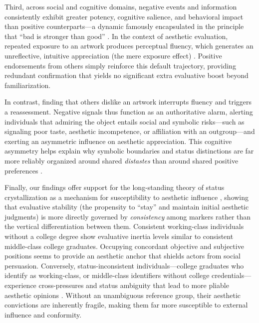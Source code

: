 \documentclass[12pt, letterpaper]{article}
\begin{document}
Third, across social and cognitive domains, negative events and information consistently exhibit greater potency, cognitive salience, and behavioral impact than positive counter\-parts---a dynamic famously encapsulated in the principle that ``bad is stronger than good'' \citep{baumeister2001bad-19b, rozin2001negativity-01e}. In the context of aesthetic evaluation, repeated exposure to an artwork produces perceptual fluency, which generates an unreflective, intuitive appreciation (the mere exposure effect) \citep{zajonc1968attitudinal, reber1998effects-efe, cutting2003gustave}. Positive endorsements from others simply reinforce this default trajectory, providing redundant confirmation that yields no significant extra evaluative boost beyond familiarization. 

In contrast, finding that others dislike an artwork interrupts fluency and triggers a reassessment. Negative signals thus function as an authoritative alarm, alerting individuals that admiring the object entails social and symbolic risks---such as signaling poor taste, aesthetic incompetence, or affiliation with an outgroup---and exerting an asymmetric influence on aesthetic appreciation. This cognitive asymmetry \citep{cerulo2010mining-1c1} helps explain why symbolic boundaries and status distinctions are far more reliably organized around shared \textit{distastes} than around shared positive preferences \citep{bourdieu1984, bryson1996, lizardo2016cultural-aaa}.

Finally, our findings offer support for the long-standing theory of status crystallization as a mechanism for susceptibility to aesthetic influence \citep{lenski1954status, hope1975models}, showing that evaluative stability (the propensity to ``stay'' and maintain initial aesthetic judgments) is more directly governed by \textit{consistency} among markers rather than the vertical differentiation between them. Consistent working-class individuals without a college degree show evaluative inertia levels similar to consistent middle-class college graduates. Occupying concordant objective and subjective positions seems to provide an aesthetic anchor that shields actors from social persuasion. Conversely, status-inconsistent individuals---college graduates who identify as working-class, or middle-class identifiers without college credentials---experience cross-pressures and status ambiguity that lead to more pliable aesthetic opinions \citep{davis1963structural-90b, correll2003expectations}. Without an unambiguous reference group, their aesthetic convictions are inherently fragile, making them far more susceptible to external influence and conformity.
\end{document}
